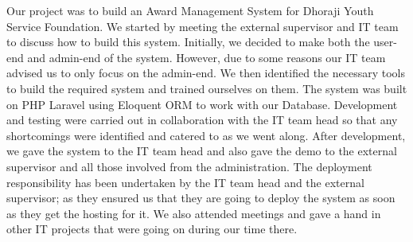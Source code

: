 \documentclass{article}
\begin{document}
Our project was to build an Award Management System for Dhoraji Youth Service Foundation. We started by meeting the external supervisor and IT team to discuss how to build this system. Initially, we decided to make both the user-end and admin-end of the system. However, due to some reasons our IT team advised us to only focus on the admin-end. We then identified the necessary tools to build the required system and trained ourselves on them. The system was built on PHP Laravel using Eloquent ORM to work with our Database. Development and testing were carried out in collaboration with the IT team head so that any shortcomings were identified and catered to as we went along. After development, we gave the system to the IT team head and also gave the demo to the external supervisor and all those involved from the administration. The deployment responsibility has been undertaken by the IT team head and the external supervisor; as they ensured us that they are going to deploy the system as soon as they get the hosting for it. We also attended meetings and gave a hand in other IT projects that were going on during our time there.


\newpage

\end{document}
